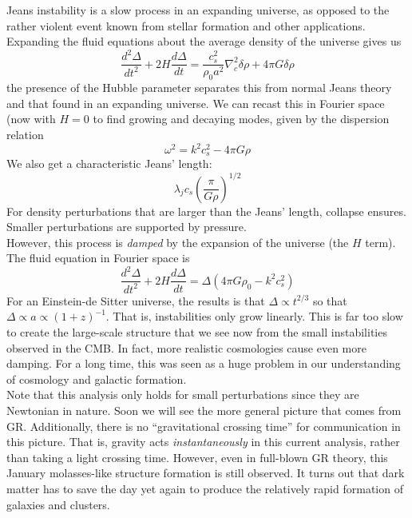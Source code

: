 \documentclass[10pt]{article}
\numberwithin{equation}{section}
\newcommand{\n}{\noindent}
\begin{document}
	\n Jeans instability is a slow process in an expanding universe, as opposed to the rather violent event known from stellar formation and other applications. Expanding the fluid equations about the average density of the universe gives us
	\begin{equation}
		\label{eq:struc1} \frac{d^2\Delta}{dt^2} + 2H \frac{d\Delta}{dt} = \frac{c_s^2}{\rho_0 a^2}\nabla_c^2\delta\rho + 4\pi G \delta \rho
	\end{equation}
	the presence of the Hubble parameter separates this from normal Jeans theory and that found in an expanding universe. We can recast this in Fourier space (now with $H=0$ to find growing and decaying modes, given by the dispersion relation
	\begin{equation}
		\label{eq:struc2} \omega^2 = k^2c_s^2 - 4\pi G\rho
	\end{equation}
	We also get a characteristic Jeans' length:
	\begin{equation}
		\label{eq:struc3} \lambda_j  c_s\left(\frac{\pi}{G\rho}\right)^{1/2}
	\end{equation}
	For density perturbations that are larger than the Jeans' length, collapse ensures. Smaller perturbations are supported by pressure.\\
	
	\n However, this process is \emph{damped} by the expansion of the universe (the $H$ term).  The fluid equation in Fourier space is 
	\begin{equation}
		\label{eq:struc4} \frac{d^2\Delta}{dt^2}+2H\frac{d\Delta}{dt} = \Delta(4\pi G\rho_0-k^2c_s^2)
	\end{equation}
	For an Einstein-de Sitter universe, the results is that $\Delta\propto t^{2/3}$ so that $\Delta\propto a\propto (1+z)^{-1}$. That is, instabilities only grow linearly. This is far too slow to create the large-scale structure that we see now from the small instabilities observed in the CMB. In fact, more realistic cosmologies cause even more damping. For a long time, this was seen as a huge problem in our understanding of cosmology and galactic formation.\\
	
	\n Note that this analysis only holds for small perturbations since they are Newtonian in nature. Soon we will see the more general picture that comes from GR. Additionally, there is no ``gravitational crossing time'' for communication in this picture. That is, gravity acts \emph{instantaneously} in this current analysis, rather than taking a light crossing time. However, even in full-blown GR theory, this January molasses-like structure formation is still observed. It turns out that dark matter has to save the day yet again to produce the relatively rapid formation of galaxies and clusters.\\
	
\end{document}
